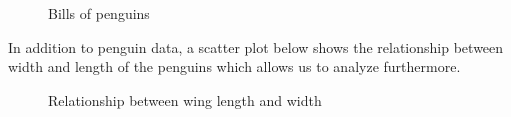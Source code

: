 \documentclass[
  letterpaper,
  DIV=11,
  numbers=noendperiod]{scrartcl}
\begin{document}
\begin{figure}


\caption{\label{fig-bills}Bills of penguins}

\end{figure}%

In addition to penguin data, a scatter plot below shows the relationship
between width and length of the penguins which allows us to analyze
furthermore.

\begin{figure}


\caption{\label{fig-planes}Relationship between wing length and width}

\end{figure}%
\end{document}
